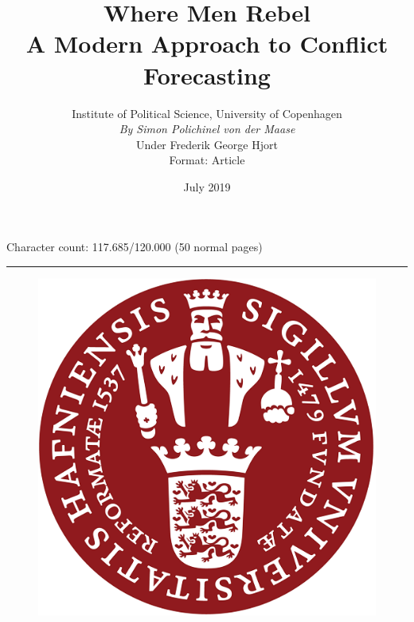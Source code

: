 \documentclass[a4paper]{article}
\title{Where Men Rebel\\A Modern Approach to Conflict Forecasting}
\author{Institute of Political Science, University of Copenhagen\\\emph{By Simon Polichinel von der Maase}\\Under Frederik George Hjort\\\footnotesize{Format: Article}}
\date{July 2019}
\begin{document}
	\begin{titlepage}
		\maketitle
		Character count: 117.685/120.000 (50 normal pages)\\
		\noindent\rule{\linewidth}{0.4pt}
		\begin{figure}[h]
			\centering
			\includegraphics[scale=0.32]{KU_logo.png}
		\end{figure}
		\thispagestyle{empty} %
	\end{titlepage}
    \tableofcontents
\pagebreak
\end{document}
